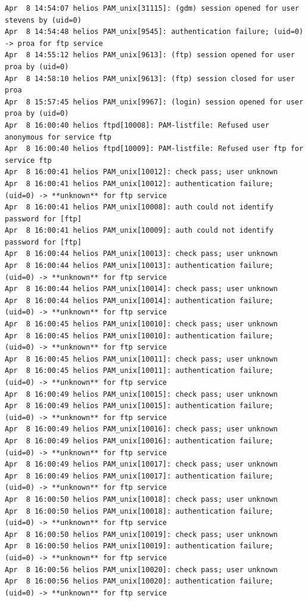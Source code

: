 \begin{lstlisting}[style=terminal]
Apr  8 14:54:07 helios PAM_unix[31115]: (gdm) session opened for user stevens by (uid=0)
Apr  8 14:54:48 helios PAM_unix[9545]: authentication failure; (uid=0) -> proa for ftp service
Apr  8 14:55:12 helios PAM_unix[9613]: (ftp) session opened for user proa by (uid=0)
Apr  8 14:58:10 helios PAM_unix[9613]: (ftp) session closed for user proa
Apr  8 15:57:45 helios PAM_unix[9967]: (login) session opened for user proa by (uid=0)
Apr  8 16:00:40 helios ftpd[10008]: PAM-listfile: Refused user anonymous for service ftp
Apr  8 16:00:40 helios ftpd[10009]: PAM-listfile: Refused user ftp for service ftp
Apr  8 16:00:41 helios PAM_unix[10012]: check pass; user unknown
Apr  8 16:00:41 helios PAM_unix[10012]: authentication failure; (uid=0) -> **unknown** for ftp service
Apr  8 16:00:41 helios PAM_unix[10008]: auth could not identify password for [ftp]
Apr  8 16:00:41 helios PAM_unix[10009]: auth could not identify password for [ftp]
Apr  8 16:00:44 helios PAM_unix[10013]: check pass; user unknown
Apr  8 16:00:44 helios PAM_unix[10013]: authentication failure; (uid=0) -> **unknown** for ftp service
Apr  8 16:00:44 helios PAM_unix[10014]: check pass; user unknown
Apr  8 16:00:44 helios PAM_unix[10014]: authentication failure; (uid=0) -> **unknown** for ftp service
Apr  8 16:00:45 helios PAM_unix[10010]: check pass; user unknown
Apr  8 16:00:45 helios PAM_unix[10010]: authentication failure; (uid=0) -> **unknown** for ftp service
Apr  8 16:00:45 helios PAM_unix[10011]: check pass; user unknown
Apr  8 16:00:45 helios PAM_unix[10011]: authentication failure; (uid=0) -> **unknown** for ftp service
Apr  8 16:00:49 helios PAM_unix[10015]: check pass; user unknown
Apr  8 16:00:49 helios PAM_unix[10015]: authentication failure; (uid=0) -> **unknown** for ftp service
Apr  8 16:00:49 helios PAM_unix[10016]: check pass; user unknown
Apr  8 16:00:49 helios PAM_unix[10016]: authentication failure; (uid=0) -> **unknown** for ftp service
Apr  8 16:00:49 helios PAM_unix[10017]: check pass; user unknown
Apr  8 16:00:49 helios PAM_unix[10017]: authentication failure; (uid=0) -> **unknown** for ftp service
Apr  8 16:00:50 helios PAM_unix[10018]: check pass; user unknown
Apr  8 16:00:50 helios PAM_unix[10018]: authentication failure; (uid=0) -> **unknown** for ftp service
Apr  8 16:00:50 helios PAM_unix[10019]: check pass; user unknown
Apr  8 16:00:50 helios PAM_unix[10019]: authentication failure; (uid=0) -> **unknown** for ftp service
Apr  8 16:00:56 helios PAM_unix[10020]: check pass; user unknown
Apr  8 16:00:56 helios PAM_unix[10020]: authentication failure; (uid=0) -> **unknown** for ftp service

\end{lstlisting}
